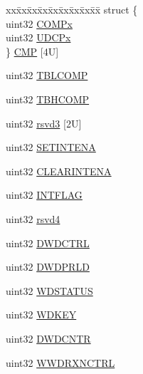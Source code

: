 \begin{DoxyCompactItemize}
\begin{tabbing}
\end{tabbing}\item 
\begin{tabbing}
xx\=xx\=xx\=xx\=xx\=xx\=xx\=xx\=xx\=\kill
struct \{\\
\>uint32 \mbox{\hyperlink{structrtiBase_ac0def4a313900e51727d08705bfffc54}{COMPx}}\\
\>uint32 \mbox{\hyperlink{structrtiBase_a2ae8480f257fe5df22d61fd8edca1fb0}{UDCPx}}\\
\} \mbox{\hyperlink{structrtiBase_aef07d6a16e2ce2119e7aa1b8c9e4a7d8}{CMP}} \mbox{[}4U\mbox{]}\\

\end{tabbing}\item 
uint32 \mbox{\hyperlink{structrtiBase_a6cc863a971efafbc66b1d79d0b127e48}{T\+B\+L\+C\+O\+MP}}
\item 
uint32 \mbox{\hyperlink{structrtiBase_a9e2cefa71a792950240cd24e8bf0fd2d}{T\+B\+H\+C\+O\+MP}}
\item 
uint32 \mbox{\hyperlink{structrtiBase_aefc905943bdc1f51c6c9a7ffda57d527}{rsvd3}} \mbox{[}2\+U\mbox{]}
\item 
uint32 \mbox{\hyperlink{structrtiBase_a738dafad4f6f42b771207ab191578c88}{S\+E\+T\+I\+N\+T\+E\+NA}}
\item 
uint32 \mbox{\hyperlink{structrtiBase_a6cd3aab94d9ef65de73218617f320ec6}{C\+L\+E\+A\+R\+I\+N\+T\+E\+NA}}
\item 
uint32 \mbox{\hyperlink{structrtiBase_a0c4ca8a285b9e98d39e952b9f4ec4541}{I\+N\+T\+F\+L\+AG}}
\item 
uint32 \mbox{\hyperlink{structrtiBase_a91816f7cc831099bd0b6158e963d94a4}{rsvd4}}
\item 
uint32 \mbox{\hyperlink{structrtiBase_addf5819e930e3855140019f5c0a67bca}{D\+W\+D\+C\+T\+RL}}
\item 
uint32 \mbox{\hyperlink{structrtiBase_a5944c898bc3f8fb6e2ee18e505b2b36f}{D\+W\+D\+P\+R\+LD}}
\item 
uint32 \mbox{\hyperlink{structrtiBase_adcd60af24d9c5362c25ff8b3af66870f}{W\+D\+S\+T\+A\+T\+US}}
\item 
uint32 \mbox{\hyperlink{structrtiBase_add0cf2a266403c59be9ba4730741b3e6}{W\+D\+K\+EY}}
\item 
uint32 \mbox{\hyperlink{structrtiBase_a58e540ffd83ecc9b8106e8c3590382fd}{D\+W\+D\+C\+N\+TR}}
\item 
uint32 \mbox{\hyperlink{structrtiBase_a912bffb2e635b456b4bd9854f0a417c8}{W\+W\+D\+R\+X\+N\+C\+T\+RL}}
\item 

\end{DoxyCompactItemize}
